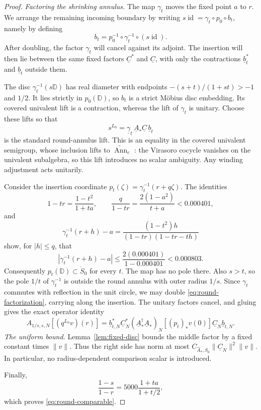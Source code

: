\begin{proof}
\emph{Factoring the shrinking annulus.}
The map $\gamma_t$ moves the fixed point $a$ to $r$.  We arrange the
remaining incoming boundary by writing
$s\operatorname{id}=\gamma_t\circ p_0\circ b_t$, namely by defining
\[
 b_t=p_0^{-1}\circ\gamma_t^{-1}\circ(s\operatorname{id}).
\]
After doubling, the factor $\gamma_t$ will cancel against its adjoint.
The insertion will then lie between the same fixed factors
$\underline C^*$ and $\underline C$, with only the contractions
$\underline b_t^*$ and $\underline b_t$ outside them.

The disc $\gamma_t^{-1}(s\mathbb D)$ has real diameter with endpoints
$-(s+t)/(1+st)>-1$ and $1/2$.  It lies strictly in $p_0(\mathbb D)$,
so $b_t$ is a strict Möbius disc embedding.  Its covered univalent lift
is a contraction, whereas the lift of $\gamma_t$ is unitary.  Choose
these lifts so that
\begin{equation}\label{eq:round-factorization}
 s^{L_0}=\underline\gamma_t\,
          \underline A_*\underline C\,\underline b_t
\end{equation}
is the standard round-annulus lift.  This is an equality in the covered
univalent semigroup, whose inclusion lifts to
$\widetilde{\operatorname{Ann}}_c$
\cite[Section~4.2]{HTVOA}: the Virasoro cocycle vanishes on the
univalent subalgebra, so this lift introduces no scalar ambiguity.
Any winding adjustment acts unitarily.

Consider the insertion coordinate
$p_t(\zeta)=\gamma_t^{-1}(r+q\zeta)$.  The identities
\[
 1-tr=\frac{1-t^2}{1+ta},\qquad
 \frac{q}{1-tr}=\frac{2(1-a^2)}{t+a}<0.000401,
\]
and
\[
 \gamma_t^{-1}(r+h)-a
   =\frac{(1-t^2)h}{(1-tr)(1-tr-th)}
\]
show, for $|h|\leq q$, that
\[
 |\gamma_t^{-1}(r+h)-a|
  \leq\frac{2(0.000401)}{1-0.000401}<0.000803.
\]
Consequently $p_t(\mathbb D)\subset\mathring S_0$ for every $t$.
The map has no pole there.  Also $s>t$, so the pole $1/t$ of
$\gamma_t^{-1}$ is outside the round annulus with outer radius $1/s$.
Since $\gamma_t$ commutes with reflection in the unit circle, we may
double \eqref{eq:round-factorization}, carrying along the insertion.
The unitary factors cancel, and gluing gives the exact operator identity
\begin{equation}\label{eq:round-doubled}
 A_{1/s,s,N}[(q^{L_0}v)(r)]
 =\underline b_{t,N}^{*}\underline C_N^{*}
    (\underline A_*^\dagger\underline A_*)_N[(p_t)_*v(0)]
    \underline C_N\underline b_{t,N}.
\end{equation}
\emph{The uniform bound.}
Lemma~\ref{lem:fixed-disc} bounds the middle factor by a fixed constant
times $\|v\|$.  Thus the right side has norm at most
$C_{\widehat A_*,S_0}\|\underline C_N\|^2\|v\|$.
In particular, no radius-dependent comparison scalar is introduced.

Finally,
\[
 \frac{1-s}{1-r}
 =5000\frac{1+ta}{1+t/2},
\]
which proves \eqref{eq:round-comparable}.
\end{proof}

